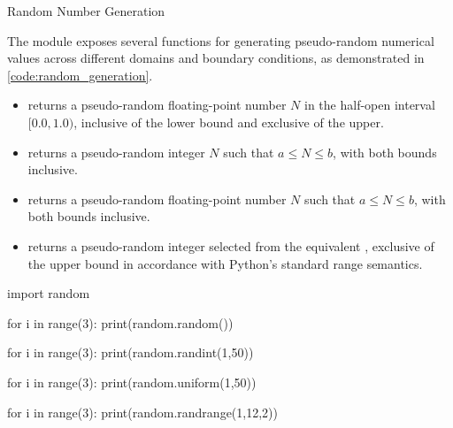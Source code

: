 \documentclass[10pt]{article}
\begin{document}
    \begin{core}{Random Number Generation}

      The  module exposes several functions for generating pseudo-random numerical values across different domains and boundary conditions, as demonstrated in \autoref{code:random_generation}.

      \begin{itemize}

        \item {} returns a pseudo-random floating-point number $N$ in the half-open interval $[0.0, 1.0)$, inclusive of the lower bound and exclusive of the upper.

        \item {} returns a pseudo-random integer $N$ such that $a \leq N \leq b$, with both bounds inclusive.

        \item {} returns a pseudo-random floating-point number $N$ such that $a \leq N \leq b$, with both bounds inclusive.

        \item {} returns a pseudo-random integer selected from the equivalent , exclusive of the upper bound in accordance with Python's standard range semantics.

      \end{itemize}

      \begin{pyconsole}

        import random

        for i in range(3):
            print(random.random())

        for i in range(3):
            print(random.randint(1,50))

        for i in range(3):
            print(random.uniform(1,50))

        for i in range(3):
            print(random.randrange(1,12,2))

      \end{pyconsole}

    \end{core}
\end{document}
